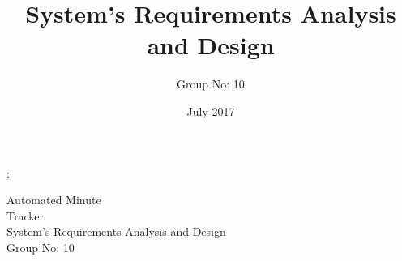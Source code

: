 \documentclass[a4paper,beamer]{article}
\begin{document}
	\title{ System's Requirements Analysis and Design}
	\author{Group No: 10}
	\date{July 2017}

	\bgroup
		;
			
		\begin{adjustwidth}{-1cm}{-1.6cm}
			\textsf{\flushright\vfill\color{white}
				\fontsize{45}{60}\selectfont\textsf{Automated Minute\\ Tracker} \\[.8cm]
				\huge  System's Requirements Analysis and Design \\[.3cm]
				\huge Group No: 10 \\}
		\end{adjustwidth}
	\egroup
	
	\newpage
	
\end{document}
